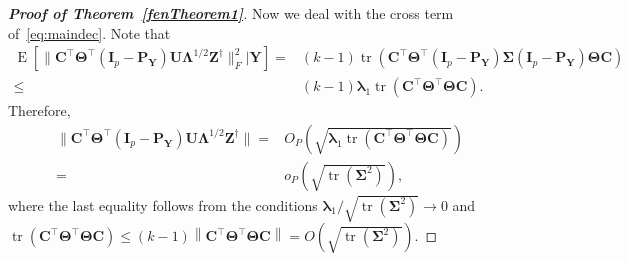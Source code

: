 \documentclass[12pt]{article} %
\DeclareMathOperator{\mytr}{tr}
\DeclareMathOperator{\myE}{E}
\newcommand{\bZ}{\mathbf{Z}}
\newcommand{\bP}{\mathbf{P}}
\newcommand{\bY}{\mathbf{Y}}
\newcommand{\bC}{\mathbf{C}}
\newcommand{\bI}{\mathbf{I}}
\newcommand{\bU}{\mathbf{U}}
\newcommand{\bfsym}[1]{\ensuremath{\boldsymbol{#1}}}
\def\blambda {\bfsym {\lambda}}
\def\bLambda {\bfsym {\Lambda}}
\def\bSigma {\bfsym {\Sigma}}
\def\bTheta {\bfsym {\Theta}}
\theoremstyle{definition}
\begin{document}
\begin{appendices}
\begin{proof}[\textbf{Proof of Theorem~\ref{fenTheorem1}}]
Now we deal with the cross term of~\eqref{eq:maindec}. Note that
$$
\begin{aligned}
    \myE [\|\bC^\top \bTheta^\top (\bI_p -\bP_{\bY})\bU\bLambda^{1/2}\bZ^{\dagger}\|_F^2|\bY]
    = &
    (k-1)\mytr\left(\bC^\top \bTheta^\top (\bI_p -\bP_{\bY})\bSigma (\bI_p -\bP_{\bY})\bTheta \bC\right)\\
    \leq &
    (k-1)\blambda_1
    \mytr\left(\bC^\top \bTheta^\top \bTheta \bC\right).
\end{aligned}
$$
Therefore,
\begin{equation}\label{bufenEq3}
    \begin{split}
\|\bC^\top \bTheta^\top (\bI_p -\bP_{\bY})\bU\bLambda^{1/2}\bZ^{\dagger}\|
=&O_P\left(
    \sqrt{
        \blambda_1
    \mytr\left(\bC^\top \bTheta^\top \bTheta \bC\right)
}
\right)
\\
=&o_P\left(\sqrt{\mytr(\bSigma^2)}\right),
    \end{split}
\end{equation}
where the last equality follows from the conditions $\blambda_1/\sqrt{\mytr(\bSigma^2)}\to 0$ and 
$
    \mytr\left(\bC^\top \bTheta^\top \bTheta \bC\right)
    \leq (k-1)
    \left\|\bC^\top \bTheta^\top \bTheta \bC\right\|=O(\sqrt{\mytr(\bSigma^2)})
    $.


\end{proof}
\end{appendices}
\end{document}
